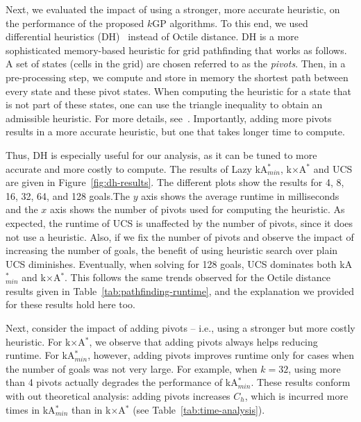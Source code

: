 \documentclass{aicom2e}
\newcommand{\kgs}{$k$GP}
\newcommand{\kastarmin}{kA$^*_{min}$}
\newcommand{\kxastar}{k$\times$A$^*$}
\begin{document}
Next, we evaluated the impact of using a stronger, more accurate heuristic, on
the performance of the proposed \kgs{} algorithms. To this end, we used
differential heuristics
(DH)~\cite{goldberg2005computing,ng2002predicting,sturtevant2009memory} instead
of Octile distance. DH is a more sophisticated memory-based heuristic for grid
pathfinding that works as follows. A set of states (cells in the grid) are
chosen  referred to as the {\em pivots}. Then, in a pre-processing step, we
compute and store in memory the shortest path between every state and these
pivot states. When computing the heuristic for a state that is not part of
these states, one can use the triangle inequality to obtain an admissible
heuristic. For more details,
see~\cite{goldberg2005computing,ng2002predicting,sturtevant2009memory}.
Importantly, adding more pivots results in a more accurate heuristic, but one
that takes longer time to compute.


Thus, DH is especially useful for our analysis, as it can be tuned to more
accurate and more costly to compute. The results of Lazy \kastarmin{},
\kxastar{} and UCS are given in Figure~\ref{fig:dh-results}. The different
plots show the results for 4, 8, 16, 32, 64, and 128 goals.The $y$ axis shows
the average runtime in milliseconds and the $x$ axis shows the number of pivots
used for computing the heuristic. As expected, the runtime of UCS is unaffected
by the number of pivots, since it does not use a heuristic. Also, if we fix the
number of pivots and observe the impact of increasing the number of goals, the
benefit of using heuristic search over plain UCS diminishes. Eventually, when
solving for 128 goals, UCS dominates both \kastarmin{} and \kxastar{}. This
follows the same trends observed for the Octile distance results given in
Table~\ref{tab:pathfinding-runtime}, and the explanation we provided for these
results hold here too.


Next, consider the impact of adding pivots -- i.e., using a stronger but more
costly heuristic. For \kxastar{}, we observe that adding pivots always helps
reducing runtime. For \kastarmin{}, however, adding pivots improves runtime
only for cases when the number of goals was not very large. For example, when
$k=32$, using more than 4 pivots actually degrades the performance of
\kastarmin{}. These results conform with out theoretical analysis: adding
pivots increases $C_h$, which is incurred more times in \kastarmin{} than in
\kxastar{} (see Table~\ref{tab:time-analysis}).
\end{document}
